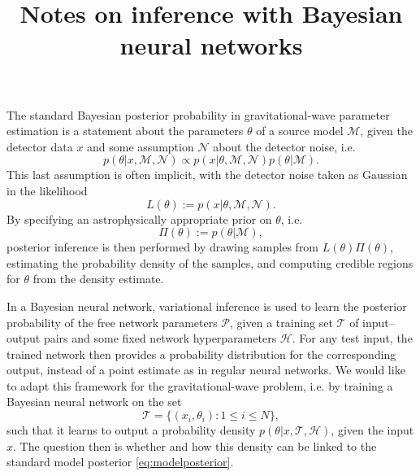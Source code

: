 \documentclass[aps,notitlepage,onecolumn]{revtex4-1}
\begin{document}
\title{Notes on inference with Bayesian neural networks}
\maketitle

The standard Bayesian posterior probability in gravitational-wave parameter estimation is a statement about the parameters $\theta$ of a source model $\mathcal{M}$, given the detector data $x$ and some assumption $\mathcal{N}$ about the detector noise, i.e.
\begin{equation}\label{eq:modelposterior}
p(\theta|x,\mathcal{M},\mathcal{N})\propto p(x|\theta,\mathcal{M},\mathcal{N})p(\theta|\mathcal{M}).
\end{equation}
This last assumption is often implicit, with the detector noise taken as Gaussian in the likelihood
\begin{equation}
L(\theta):=p(x|\theta,\mathcal{M},\mathcal{N}).
\end{equation}
By specifying an astrophysically appropriate prior on $\theta$, i.e.
\begin{equation}
\Pi(\theta):=p(\theta|\mathcal{M}),
\end{equation}
posterior inference is then performed by drawing samples from $L(\theta)\Pi(\theta)$, estimating the probability density of the samples, and computing credible regions for $\theta$ from the density estimate.

In a Bayesian neural network, variational inference is used to learn the posterior probability of the free network parameters $\mathcal{P}$, given a training set $\mathcal{T}$ of input--output pairs and some fixed network hyperparameters $\mathcal{H}$. For any test input, the trained network then provides a probability distribution for the corresponding output, instead of a point estimate as in regular neural networks. We would like to adapt this framework for the gravitational-wave problem, i.e. by training a Bayesian neural network on the set
\begin{equation}
\mathcal{T}=\{(x_i,\theta_i):1\leq i\leq N\},
\end{equation}
such that it learns to output a probability density $p(\theta|x,\mathcal{T},\mathcal{H})$, given the input $x$. The question then is whether and how this density can be linked to the standard model posterior \eqref{eq:modelposterior}.
\end{document}
